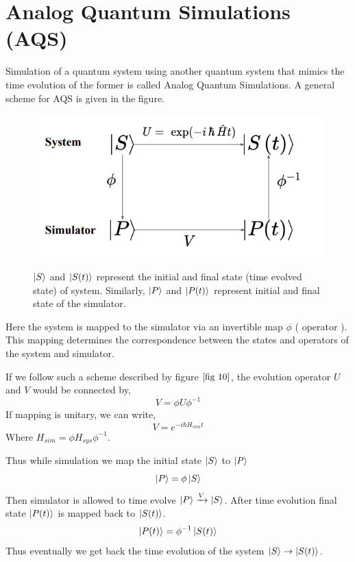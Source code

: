 \documentclass[12pt,a4paper]{report}
\begin{document}
\section{Analog Quantum Simulations (AQS)}
Simulation of a quantum system using another quantum system that mimics the time evolution of the former is called Analog Quantum Simulations. A general scheme for AQS is given in the figure.
\begin{figure}[h]
	\graphicspath{ {./Images/} }	
	{\includegraphics[width=\textwidth]{fig_10.png}}
	\centering
	\caption{$\ket{S}$ and $\ket{S(t)}$ represent the initial and final state (time evolved state) of system. Similarly, $\ket{P}$ and $\ket{P(t)}$ represent initial and final state of the simulator. }
	\label{fig 10}
\end{figure}
Here the system is mapped to the simulator via an invertible map $\phi$ ( operator ). This mapping determines the correspondence between the states and operators of the system and simulator.\par
If we follow such a scheme described by figure $\ref*{fig 10}$, the evolution operator $U$ and $ V$ would be connected by,
\begin{equation}
V = \phi U \phi^{-1}
\end{equation}
If mapping is unitary, we can write,
\begin{equation}
V = e^{- i \hbar H_{sim} t}
\end{equation}
Where $H_{sim} = \phi H_{sys} \phi^{-1}$.\par
Thus while simulation we map the initial state $\ket{S}$ to $\ket{P}$
\begin{equation}
\ket{P} = \phi \ket{S} 
\end{equation}
Then simulator is allowed to time evolve $\ket{P} \xrightarrow{V} \ket{S}$. After time evolution final state $\ket{P(t)}$ is mapped back to $\ket{S(t)}$.
\begin{equation}
\ket{P(t)} = \phi^{-1}\ket{S(t)}
\end{equation}
Thus eventually we get back the time evolution of the system $\ket{S} \rightarrow \ket{S(t)}$.
\end{document}
